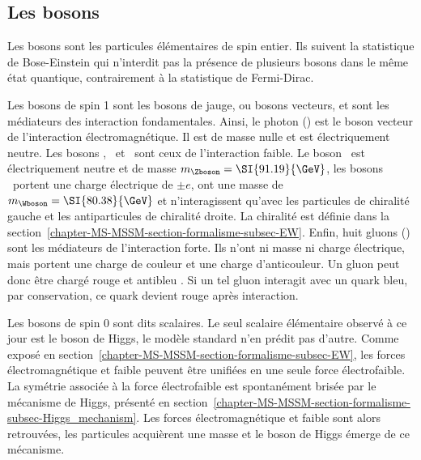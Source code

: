 \subsection{Les bosons}\label{chapter-MS-MSSM-section-SM_ptcs-subsec-bosons}
Les bosons sont les particules élémentaires de spin entier.
Ils suivent la statistique de Bose-Einstein qui n'interdit pas la présence de plusieurs bosons dans le même état quantique, contrairement à la statistique de Fermi-Dirac.
\par
Les bosons de spin 1 sont les bosons de jauge, ou bosons vecteurs, et sont les médiateurs des interaction fondamentales.
Ainsi, le photon (\photon) est le boson vecteur de l'interaction électromagnétique. Il est de masse nulle et est électriquement neutre.
Les bosons \Wbosonplus, \Wbosonminus\ et \Zboson\ sont ceux de l'interaction faible. Le boson \Zboson\ est électriquement neutre et de masse $m_\Zboson=\SI{91.19}{\GeV}$, les bosons \Wboson\ portent une charge électrique de $\pm e$, ont une masse de $m_\Wboson=\SI{80.38}{\GeV}$ et n'interagissent qu'avec les particules de chiralité gauche et les antiparticules de chiralité droite.
La chiralité est définie dans la section~\ref{chapter-MS-MSSM-section-formalisme-subsec-EW}.
Enfin, huit gluons (\gluon) sont les médiateurs de l'interaction forte. Ils n'ont ni masse ni charge électrique, mais portent une charge de couleur et une charge d'anticouleur. Un gluon peut donc être chargé \og rouge et antibleu \fg{}. Si un tel gluon interagit avec un quark bleu, par conservation, ce quark devient rouge après interaction.
\par
Les bosons de spin 0 sont dits scalaires.
Le seul scalaire élémentaire observé à ce jour est le boson de Higgs, le modèle standard n'en prédit pas d'autre.
Comme exposé en section~\ref{chapter-MS-MSSM-section-formalisme-subsec-EW},
les forces électromagnétique et faible peuvent être unifiées en une seule force électrofaible.
La symétrie associée à la force électrofaible est spontanément brisée
par le mécanisme de Higgs,
présenté en section~\ref{chapter-MS-MSSM-section-formalisme-subsec-Higgs_mechanism}.
Les forces électromagnétique et faible
sont alors retrouvées,
les particules acquièrent une masse
et le boson de Higgs émerge de ce mécanisme.

%
%
